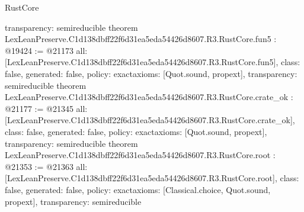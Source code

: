 \begin{lexlean}{RustCore}
\begin{coremodule}
{  transparency: semireducible
}
theorem LexLeanPreserve.C1d138dbff22f6d31ea5eda54426d8607.R3.RustCore.fun5 : @19424 := @21173 {
  all: [LexLeanPreserve.C1d138dbff22f6d31ea5eda54426d8607.R3.RustCore.fun5],
  class: false,
  generated: false,
  policy: exact{axioms: [Quot.sound, propext]},
  transparency: semireducible
}
theorem LexLeanPreserve.C1d138dbff22f6d31ea5eda54426d8607.R3.RustCore.crate_ok : @21177 := @21345 {
  all: [LexLeanPreserve.C1d138dbff22f6d31ea5eda54426d8607.R3.RustCore.crate_ok],
  class: false,
  generated: false,
  policy: exact{axioms: [Quot.sound, propext]},
  transparency: semireducible
}
theorem LexLeanPreserve.C1d138dbff22f6d31ea5eda54426d8607.R3.RustCore.root : @21353 := @21363 {
  all: [LexLeanPreserve.C1d138dbff22f6d31ea5eda54426d8607.R3.RustCore.root],
  class: false,
  generated: false,
  policy: exact{axioms: [Classical.choice, Quot.sound, propext]},
  transparency: semireducible
}


\end{coremodule}
\end{lexlean}
